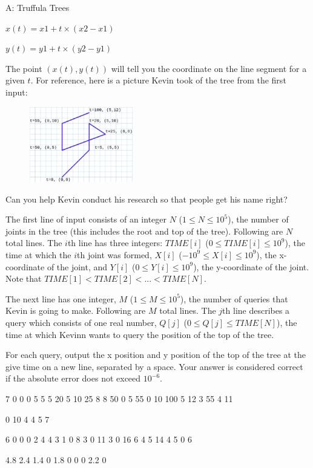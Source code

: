 \begin{problem}{A: Truffula Trees}
\begin{center}
$x(t) = x1 + t \times (x2 - x1)$

$y(t) = y1 + t \times (y2 - y1)$
\end{center}

The point $(x(t), y(t))$ will tell you the coordinate on the line segment for a given $t$. For reference, here is a picture Kevin took of the tree from the first input:

\begin{figure}[h]
    \centering
    \includegraphics[width=0.4\textwidth]{tree.eps}
\end{figure}

Can you help Kevin conduct his research so that people get his name right?

\end{problem}

\begin{formalin}
The first line of input consists of an integer $N$ ($1 \leq N \leq 10^{5}$), the number of joints in the tree (this includes the root and top of the tree). Following are $N$ total lines. The $i$th line has three integers: $TIME[i]$ ($0 \le TIME[i] \le 10^{9}$), the time at which the $i$th joint was formed, $X[i]$ ($-10^{9} \leq X[i] \leq 10^{9}$), the x-coordinate of the joint, and $Y[i]$ ($0 \leq Y[i] \leq 10^{9}$), the y-coordinate of the joint. Note that $TIME[1] < TIME[2] < ... < TIME[N]$.

The next line has one integer, $M$ ($1 \leq M \leq 10^{5}$), the number of queries that Kevin is going to make. Following are $M$ total lines. The $j$th line describes a query which consists of one real number, $Q[j]$ ($0 \leq Q[j] \leq TIME[N]$), the time at which Kevinn wants to query the position of the top of the tree.
\end{formalin}

\begin{formalout}


\end{formalout}

For each query, output the x position and y position of the top of the tree at the give time on a new line, separated by a space. Your answer is considered correct if the absolute error does not exceed $10^{-6}$.

\begin{datain}
7
0 0 0
5 5 5
20 5 10
25 8 8
50 0 5
55 0 10
100 5 12
3
55
4
11
\end{datain}
\begin{dataout}
0 10
4 4
5 7
\end{dataout}

\begin{datain}
6
0 0 0
2 4 4
3 1 0
8 3 0
11 3 0
16 6 4
5
14
4
5
0
6
\end{datain}
\begin{dataout}
4.8 2.4
1.4 0
1.8 0
0 0
2.2 0
\end{dataout}
